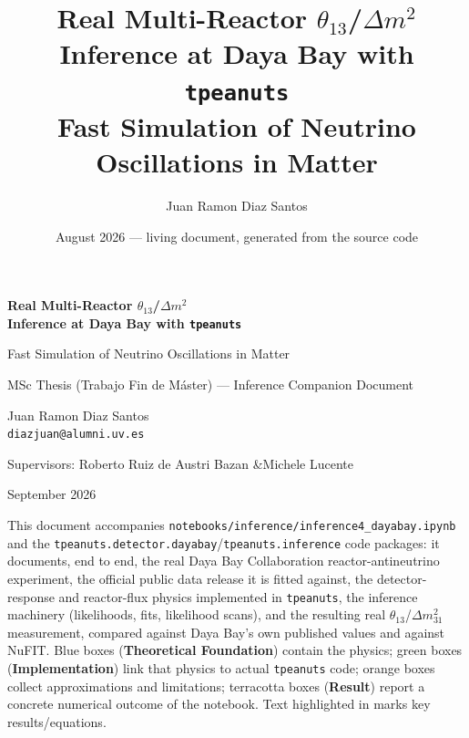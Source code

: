 \documentclass[11pt,a4paper,openany]{report}
\title{\Huge Real Multi-Reactor $\theta_{13}$/$\Delta m^2$ Inference at Daya Bay with \texttt{tpeanuts}\\[4pt]
  \Large Fast Simulation of Neutrino Oscillations in Matter}
\author{Juan Ramon Diaz Santos}
\date{August 2026 --- living document, generated from the source code}
\begin{document}
\begin{titlepage}
  \centering
  \vspace*{1.6cm}
  {\Huge\bfseries\color{dayabayColor} Real Multi-Reactor $\theta_{13}$/$\Delta m^2$\\[4pt] Inference at Daya Bay with \texttt{tpeanuts}\par}
  \vspace{0.8cm}
  {\Large Fast Simulation of Neutrino Oscillations in Matter\par}
  \vspace{1.5cm}
  {\large MSc Thesis (Trabajo Fin de M\'aster) --- Inference Companion Document\par}
  \vspace{0.3cm}
  {\large Juan Ramon Diaz Santos \\ \texttt{diazjuan@alumni.uv.es}\par}
  \vspace{0.6cm}
  {\normalsize Supervisors: Roberto Ruiz de Austri Bazan \quad\&\quad Michele Lucente\par}
  \vfill
  {\normalsize September 2026\par}
  \vspace{0.5cm}
  \begin{tcolorbox}[colback=dayabayColor!5,colframe=dayabayColor,width=0.85\textwidth,sharp corners=all,rounded corners=all,arc=1mm]
    \small
    This document accompanies \texttt{notebooks/inference/inference4\_dayabay.ipynb} and the
    \texttt{tpeanuts.detector.dayabay}/\texttt{tpeanuts.inference} code packages: it documents,
    end to end, the real Daya Bay Collaboration reactor-antineutrino experiment, the official
    public data release it is fitted against, the detector-response and reactor-flux physics
    implemented in \texttt{tpeanuts}, the inference machinery (likelihoods, fits, likelihood
    scans), and the resulting real $\theta_{13}$/$\Delta m^2_{31}$ measurement, compared against
    Daya Bay's own published values and against NuFIT. Blue boxes (\textbf{Theoretical
    Foundation}) contain the physics; green boxes (\textbf{Implementation}) link that physics to
    actual \texttt{tpeanuts} code; orange boxes collect approximations and limitations; terracotta
    boxes (\textbf{Result}) report a concrete numerical outcome of the notebook. Text highlighted
    in  marks key results/equations.
  \end{tcolorbox}
\end{titlepage}

\tableofcontents
{}
\clearpage
{}
\end{document}
